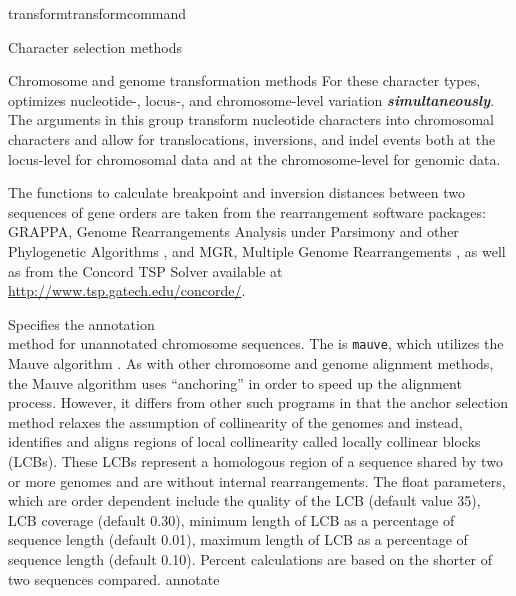 \begin{command}{transform}{transformcommand}
\begin{arguments}
\begin{argumentgroup}{Character selection methods}
             \end{argumentgroup}
         

        \begin{argumentgroup}{Chromosome and genome transformation methods}
            For these character types, \poy optimizes nucleotide-, 
            locus-, and chromosome-level variation {\bf \emph{simultaneously}}. The arguments in this group
            transform nucleotide characters into chromosomal characters and allow for 
            translocations, inversions, and indel events both at the locus-level for chromosomal data 
            and at the chromosome-level for genomic data.
           
           \indent The functions to calculate breakpoint and inversion distances between
            two sequences of gene orders are taken from the rearrangement software
            packages: GRAPPA, Genome Rearrangements Analysis under Parsimony and
            other Phylogenetic Algorithms \cite{baderetal2002}, and MGR, Multiple
            Genome Rearrangements \cite{bourqueandpevzner2002}, as well as from
            the Concord TSP Solver available at \url{http://www.tsp.gatech.edu/concorde/}.

                {Specifies the annotation \\method for unannotated chromosome 
                sequences. The \poylident is \texttt{mauve}, which utilizes the 
                Mauve algorithm \cite{darlingetal2004}. As with other chromosome 
                and genome alignment methods, the Mauve algorithm uses ``anchoring'' 
                in order to speed up the alignment process. However, it differs from 
                other such programs in that the anchor selection method relaxes 
                the assumption of collinearity of the genomes and instead, identifies 
                and aligns regions of local collinearity called locally collinear 
                blocks (LCBs). These LCBs represent a homologous region 
                of a sequence shared by two or more genomes and are without internal
                rearrangements.  The float parameters, which are order dependent 
                 include the quality of the LCB (default value 35), LCB coverage (default 0.30), 
                minimum length of LCB as a percentage of sequence length (default 0.01), 
                maximum length of LCB as a percentage of sequence length (default 0.10).  
                Percent calculations are based on the shorter of two sequences compared.}
                {annotate}
                                        

\end{argumentgroup}
\end{arguments}
\end{command}
